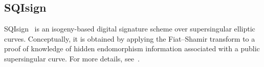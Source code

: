 



\subsection{SQIsign}

SQIsign~\cite{DKL+20} is an isogeny-based digital signature scheme over supersingular elliptic curves.
Conceptually, it is obtained by applying the Fiat--Shamir transform to a proof of knowledge of hidden endomorphism information associated with a public supersingular curve. For more details, see~\cite{AAA+25}.


